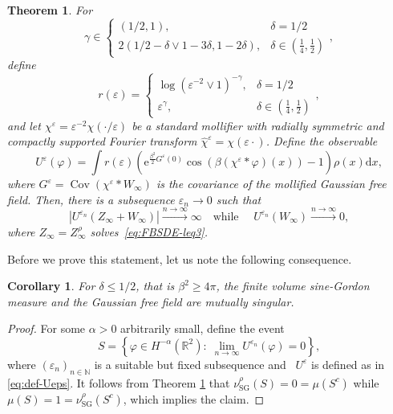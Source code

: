\documentclass[11pt, a4paper]{scrartcl}
\numberwithin{equation}{section}
\theoremstyle{plain}
\newtheorem{theorem}[foo]{Theorem}
\newtheorem{corollary}[foo]{Corollary}
\theoremstyle{remark}
\newcommand{\mathd}{\mathrm{d}}
\newcommand{\mathe}{\mathrm{e}}
\newcommand{\tmop}[1]{\ensuremath{\operatorname{#1}}}
\begin{document}
\begin{theorem}
	\label{thm:Ueps-div}For
	\[\gamma \in \begin{cases}
			(1 / 2, 1),                                         & \delta = 1 / 2                      \\
			2 (1 / 2 - \delta \vee 1 - 3 \delta, 1 - 2 \delta), & \delta \in(\frac{1}{4},\frac{1}{2})
		\end{cases},\]
	define
	\[ r (\varepsilon) = \begin{cases}
			\log (\varepsilon^{- 2} \vee 1)^{- \gamma}, & \text{$\delta = 1 / 2$
			}                                                                                          \\
			{\varepsilon^{\gamma}} , \,                 & \text{$\delta \in(\frac{1}{4},\frac{1}{2})$}
		\end{cases},\]
	and let $\chi^{\varepsilon} = \varepsilon^{- 2} \chi (\cdot / \varepsilon)$
	be a standard mollifier with radially symmetric and compactly supported
	Fourier transform $\hat{\chi}^{\varepsilon} = \chi (\varepsilon \cdot)$.
	Define the observable
	\begin{equation}
		U^{\varepsilon} (\varphi) = \int r (\varepsilon) \left(
		\mathe^{\frac{\beta^2}{2} G^{\varepsilon} (0)} \cos (\beta
				(\chi^{\varepsilon} \ast \varphi) (x)) - 1 \right) \rho (x) \mathd x,
		\label{eq:def-Ueps}
	\end{equation}
	where $G^{\varepsilon} = \tmop{Cov} (\chi^{\varepsilon} \ast W_{\infty})$ is
	the covariance of the mollified Gaussian free field. Then, there is a
	subsequence $\varepsilon_n \rightarrow 0$ such that
	\begin{equation}
		| U^{\varepsilon_n} (Z_{\infty} + W_{\infty}) | \overset{n \rightarrow
			\infty}{\longrightarrow} \infty \quad \text{while } \quad
		U^{\varepsilon_n} (W_{\infty}) \overset{n \rightarrow
			\infty}{\longrightarrow} 0, \label{eq:Ueps-div}
	\end{equation}
	where $Z_{\infty} = Z_{\infty}^{\rho}$ solves~\eqref{eq:FBSDE-leq3}.
\end{theorem}
Before we prove this statement, let us note the following consequence.

\begin{corollary}
	For $\delta \leqslant 1 / 2$, that is $\beta^2 \geqslant 4 \pi$, the finite
	volume sine-Gordon measure and the Gaussian free field are mutually
	singular.
\end{corollary}

\begin{proof}
	For some $\alpha > 0$ arbitrarily small, define the event
	\[ S = \left\{ \varphi \in H^{- \alpha} (\mathbb{R}^2) : \; \lim_{n
			\rightarrow \infty} U^{\varepsilon_n} (\varphi) = 0 \right\}, \]
	where $(\varepsilon_n)_{n \in \mathbb{N}}$ is a suitable but fixed subsequence and \
	$U^{\varepsilon}$ is defined as in \eqref{eq:def-Ueps}. It follows from
	Theorem \ref{thm:Ueps-div} that $\nu_{\tmop{SG}}^{\rho} (S) = 0 = \mu(S^c)$ while
	$\mu (S) = 1 = \nu_{\tmop{SG}}^{\rho} (S^c)$, which implies the claim.
\end{proof}
\end{document}
